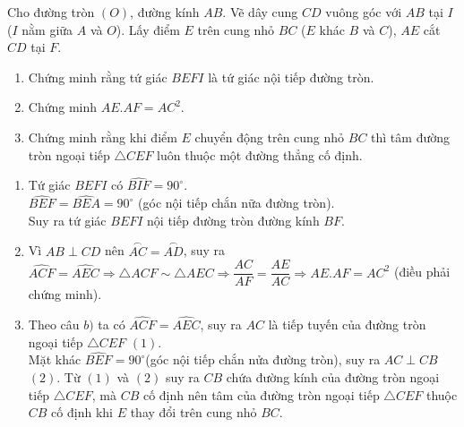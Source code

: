 \begin{ex}%
    Cho đường tròn $(O)$, đường kính $AB$. Vẽ dây cung $CD$ vuông góc với $AB$ tại $I$ ($I$ nằm giữa $A$ và $O$). Lấy điểm $E$ trên cung nhỏ $BC$ ($E$ khác $B$ và $C$), $AE$ cắt $CD$ tại $F$. 
     \begin{enumerate}
        \item Chứng minh rằng tứ giác $BEFI$ là tứ giác nội tiếp đường tròn.
        \item Chứng minh $AE.AF = AC^2$.
        \item Chứng minh rằng khi điểm $E$ chuyển động trên cung nhỏ $BC$ thì tâm đường tròn ngoại tiếp $\triangle CEF$ luôn thuộc một đường thẳng cố định.
      \end{enumerate}
\loigiai
    {
    \begin{center}
    \end{center}
    \begin{enumerate}
        \item Tứ giác $BEFI$ có $\widehat{BIF}=90^\circ$.\\
        $\widehat{BEF}=\widehat{BEA}=90^\circ$ (góc nội tiếp chắn nữa đường tròn).\\
        Suy ra tứ giác $BEFI$ nội tiếp đường tròn đường kính $BF$.
        \item Vì $AB\perp CD$ nên $\overset{\frown}{AC}=\overset{\frown}{AD}$, suy ra $\widehat{ACF}=\widehat{AEC}\Rightarrow \triangle ACF\sim \triangle AEC\Rightarrow \dfrac{AC}{AF}=\dfrac{AE}{AC}\Rightarrow AE.AF=AC^2$ (điều phải chứng minh).
        \item Theo câu $b)$ ta có $\widehat{ACF}=\widehat{AEC}$, suy ra $AC$ là tiếp tuyến của đường tròn ngoại tiếp $\triangle CEF$ $(1)$.\\
        Mặt khác $\widehat{BEF}=90^\circ$(góc nội tiếp chắn nửa đường tròn), suy ra $AC\perp CB$ $(2)$.
        Từ $(1)$ và $(2)$ suy ra $CB$ chứa đường kính của đường tròn ngoại tiếp $\triangle CEF$, mà $CB$ cố định nên tâm của đường tròn ngoại tiếp $\triangle CEF$ thuộc $CB$ cố định khi $E$ thay đổi trên cung nhỏ $BC$.
       \end{enumerate}
    }
\end{ex}

